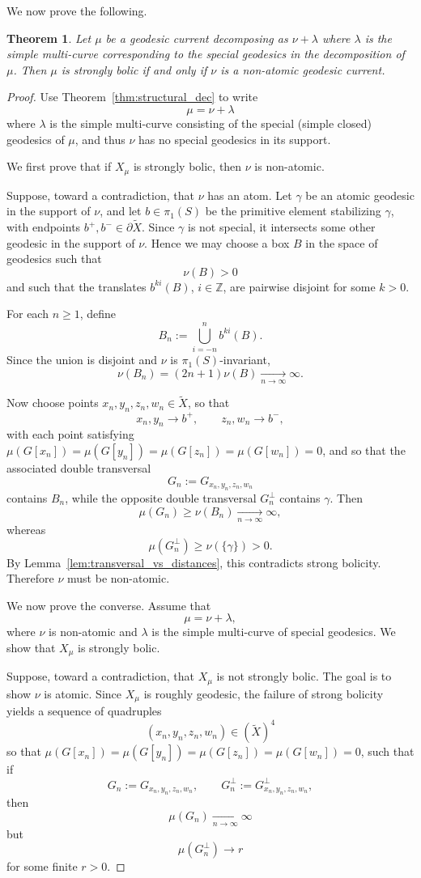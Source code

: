 \documentclass[12pt]{amsart}
\numberwithin{equation}{section}
\numberwithin{figure}{section}
\newtheorem{theorem}[equation]{Theorem}
\theoremstyle{definition}
\theoremstyle{plain}
\begin{document}
We now prove the following.

\begin{theorem}
Let $\mu$ be a geodesic current decomposing as $\nu + \lambda$ where $\lambda$ is the simple multi-curve corresponding to the special geodesics in the decomposition of $\mu$. Then $\mu$ is strongly bolic if and only if $\nu$ is a non-atomic geodesic current.
\label{thm:bolic}
\end{theorem}
\begin{proof}
Use Theorem~\ref{thm:structural_dec} to write
\[
\mu=\nu+\lambda
\]
where $\lambda$ is the simple multi-curve consisting of the special (simple closed) geodesics of $\mu$, and thus $\nu$ has no special geodesics in its support.

We first prove that if $X_\mu$ is strongly bolic, then $\nu$ is non-atomic.

Suppose, toward a contradiction, that $\nu$ has an atom. Let $\gamma$ be an atomic geodesic in the support of $\nu$, and let $b\in \pi_1(S)$ be the primitive element stabilizing $\gamma$, with endpoints $b^+,b^-\in \partial \widetilde X$. Since $\gamma$ is not special, it intersects some other geodesic in the support of $\nu$. Hence we may choose a box $B$ in the space of geodesics such that
\[
\nu(B)>0
\]
and such that the translates $b^{ki}(B)$, $i\in \mathbb Z$, are pairwise disjoint for some $k>0$.

For each $n\ge 1$, define
\[
B_n:=\bigcup_{i=-n}^n b^{ki}(B).
\]
Since the union is disjoint and $\nu$ is $\pi_1(S)$-invariant,
\[
\nu(B_n)=(2n+1)\nu(B)\xrightarrow[n\to\infty]{}\infty.
\]

Now choose points $x_n,y_n,z_n,w_n\in  \widetilde X$, so that
\[
x_n,y_n\to b^+,
\qquad
z_n,w_n\to b^-,
\]
with each point satisfying  $\mu(G[x_n])=\mu(G[y_n])=\mu(G[z_n])=\mu(G[w_n])=0$, and so that the associated double transversal
\[
G_n:=G_{x_n,y_n,z_n,w_n}
\]
contains $B_n$, while the opposite double transversal $G_n^\perp$ contains $\gamma$. Then
\[
\mu(G_n)\ge \nu(B_n)\xrightarrow[n\to\infty]{}\infty,
\]
whereas
\[
\mu(G_n^\perp)\ge \nu(\{\gamma\})>0.
\]
By Lemma~\ref{lem:transversal_vs_distances}, this contradicts strong bolicity. Therefore $\nu$ must be non-atomic.

We now prove the converse. Assume that
\[
\mu=\nu+\lambda,
\]
where $\nu$ is non-atomic and $\lambda$ is the simple multi-curve of special geodesics. We show that $X_\mu$ is strongly bolic.

Suppose, toward a contradiction, that $X_\mu$ is not strongly bolic. The goal is to show $\nu$ is atomic. Since $X_\mu$ is roughly geodesic, the failure of strong bolicity yields a sequence of quadruples
\[
(x_n,y_n,z_n,w_n)\in (\widetilde X)^4
\]
 so that $\mu(G[x_n])=\mu(G[y_n])=\mu(G[z_n])=\mu(G[w_n])=0$, such that if
\[
G_n:=G_{x_n,y_n,z_n,w_n},
\qquad
G_n^\perp:=G^\perp_{x_n,y_n,z_n,w_n},
\]
then
\[
\mu(G_n)\xrightarrow[n\to\infty]{}\infty
\]
but
\[
\mu(G_n^\perp)\to r
\]
for some finite $r>0$.


\end{proof}
\end{document}

